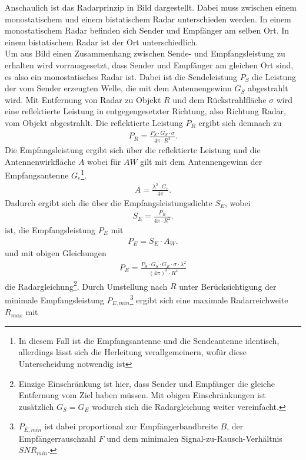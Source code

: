 Anschaulich ist das Radarprinzip in Bild dargestellt. Dabei muss zwischen einem monostatischem und einem bistatischem Radar unterschieden werden. In einem monostatischem Radar befinden sich Sender und Empfänger am selben Ort. In einem bistatischem Radar ist der Ort unterschiedlich. \\
Um aus Bild einen Zusammenhang zwischen Sende- und Empfangsleistung zu erhalten wird vorrausgesetzt, dass Sender und Empfänger am gleichen Ort sind, es also ein monostatisches Radar ist. Dabei ist die Sendeleistung $P_{S}$ die Leistung der vom Sender erzeugten Welle, die mit dem Antennengewinn $G_{S}$ abgestrahlt wird. Mit Entfernung von Radar zu Objekt $R$ und dem Rückstrahlfläche $\sigma$ wird eine reflektierte Leistung in entgegengesetzter Richtung, also Richtung Radar, vom Objekt abgestrahlt. Die reflektierte Leistung $P_{R}$ ergibt sich demnach zu
\begin{align}
P_{R} = \frac{P_{S} \cdot G_{S} \cdot \sigma}{4\pi \cdot R^2}.
\end{align} Die Empfangsleistung ergibt sich über die reflektierte Leistung und die Antennenwirkfläche $A$ wobei für $A{W}$ gilt mit dem Antennengewinn der Empfangsantenne $G_{e}$\footnote{In diesem Fall ist die Empfangsantenne und die Sendeantenne identisch, allerdings lässt sich die Herleitung verallgemeinern, wofür diese Unterscheidung notwendig ist}. 
\begin{align}
A = \frac{\lambda^2 \cdot G_{e}}{4\pi}.
\end{align}
Dadurch ergibt sich die über die Empfangsleistungsdichte $S_{E}$, wobei 
\begin{align}
S_{E} = \frac{P_{R}}{4\pi \cdot R^2}.
\end{align}
ist, die 
Empfangsleistung $P_{E}$ mit
\begin{align}
P_{E} = S_{E}\cdot A_{W}.
\end{align}
und mit obigen Gleichungen
\begin{align}
P_{E} = \frac{P_{S} \cdot G_{S} \cdot G_{E} \cdot \sigma \cdot \lambda^2}{(4\pi)^3\cdot R^4}
\end{align}
die Radargleichung\footnote{Einzige Einschränkung ist hier, dass Sender und Empfänger die gleiche Entfernung vom Ziel haben müssen. Mit obigen Einschränkungen ist zusätzlich $G_{S} = G_{E}$ wodurch sich die Radargleichung weiter vereinfacht.}.
Durch Umstellung nach $R$ unter Berücksichtigung der minimale Empfangsleistung $P_{E,min}$\footnote{$P_{E,min}$ ist dabei proportional zur Empfängerbandbreite
$B$, der Empfängerrauschzahl $F$ und dem minimalen Signal-zu-Rausch-Verhältnis $SNR_{min}$.} ergibt sich eine maximale Radarreichweite $R_{max}$ mit
